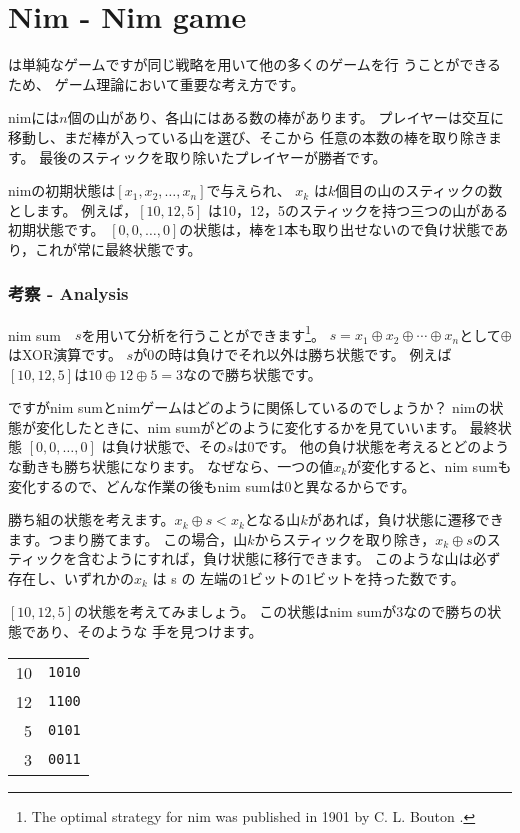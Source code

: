 \section{Nim - Nim game}


は単純なゲームですが同じ戦略を用いて他の多くのゲームを行 うことができるため、
ゲーム理論において重要な考え方です。

nimには$n$個の山があり、各山にはある数の棒があります。
プレイヤーは交互に移動し、まだ棒が入っている山を選び、そこから 任意の本数の棒を取り除きます。
最後のスティックを取り除いたプレイヤーが勝者です。

nimの初期状態は$[x_1,x_2,\ldots,x_n]$で与えられ、
$x_k$ は$k$個目の山のスティックの数とします。
例えば，$[10, 12, 5]$ は10，12，5のスティックを持つ三つの山がある初期状態です。
$[0,0,\ldots,0]$の状態は，棒を1本も取り出せないので負け状態であり，これが常に最終状態です。

\subsubsection{考察 - Analysis}

nim sum　$s$を用いて分析を行うことができます\footnote{The optimal strategy
for nim was published in 1901 by C. L. Bouton \cite{bou01}.}。
$s = x_1 \oplus x_2 \oplus \cdots \oplus x_n$として$\oplus$はXOR演算です。
$s$が0の時は負けでそれ以外は勝ち状態です。
例えば$[10,12,5]$は$10 \oplus 12 \oplus 5 = 3$なので勝ち状態です。

ですがnim sumとnimゲームはどのように関係しているのでしょうか？
nimの状態が変化したときに、nim sumがどのように変化するかを見ていいます。
最終状態 $[0,0,\ldots,0]$ は負け状態で、その$s$は0です。
他の負け状態を考えるとどのような動きも勝ち状態になります。
なぜなら、一つの値$x_k$が変化すると、nim sumも変化するので、どんな作業の後もnim sumは0と異なるからです。

勝ち組の状態を考えます。$x_k \oplus s < x_k$となる山$k$があれば，負け状態に遷移できます。つまり勝てます。
この場合，山$k$からスティックを取り除き，$x_k \oplus s$のスティックを含むようにすれば，負け状態に移行できます。
このような山は必ず存在し、いずれかの$x_k$ は s の 左端の1ビットの1ビットを持った数です。

$[10, 12, 5]$の状態を考えてみましょう。
この状態はnim sumが3なので勝ちの状態であり、そのような 手を見つけます。

\begin{center}
\begin{tabular}{r|r}
10 & \texttt{1010} \\
12 & \texttt{1100} \\
5 & \texttt{0101} \\
\hline
3 & \texttt{0011} \\
\end{tabular}
\end{center}


